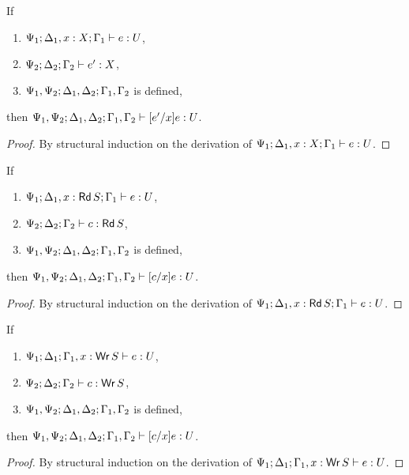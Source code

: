 \begin{lemma}\label{lem:sub-aff}
  If
  \begin{enumerate}
  \item $\Psi_1; \Delta_1, x : X; \Gamma_1 |- e : U$,
  \item $\Psi_2; \Delta_2; \Gamma_2 |- e' : X$,
  \item $\Psi_1,\Psi_2 ; \Delta_1,\Delta_2 ; \Gamma_1,\Gamma_2$ is defined,
  \end{enumerate}
  then $\Psi_1,\Psi_2; \Delta_1,\Delta_2; \Gamma_1,\Gamma_2 |- [e'/x]e : U$.
  \begin{proof}
    By structural induction on the derivation of $\Psi_1; \Delta_1, x : X; \Gamma_1 |- e : U$.
  \end{proof}
\end{lemma}

\begin{lemma}\label{lem:sub-rd}
  If
  \begin{enumerate}
  \item $\Psi_1; \Delta_1, x : \textnormal{\textsf{Rd}}\,S; \Gamma_1 |- e : U$,
  \item $\Psi_2; \Delta_2; \Gamma_2 |- c : \textnormal{\textsf{Rd}}\,S$,
  \item $\Psi_1,\Psi_2 ; \Delta_1,\Delta_2 ; \Gamma_1,\Gamma_2$ is defined,
  \end{enumerate}
  then $\Psi_1,\Psi_2; \Delta_1,\Delta_2; \Gamma_1,\Gamma_2 |- [c/x]e : U$.
  \begin{proof}
    By structural induction on the derivation of $\Psi_1; \Delta_1, x : \textnormal{\textsf{Rd}}\,S; \Gamma_1 |- e : U$.
  \end{proof}
\end{lemma}

\begin{lemma}\label{lem:sub-wr}
  If
  \begin{enumerate}
  \item $\Psi_1; \Delta_1; \Gamma_1, x : \textnormal{\textsf{Wr}}\,S |- e : U$,
  \item $\Psi_2; \Delta_2; \Gamma_2 |- c : \textnormal{\textsf{Wr}}\,S$,
  \item $\Psi_1,\Psi_2 ; \Delta_1,\Delta_2 ; \Gamma_1,\Gamma_2$ is defined,
  \end{enumerate}
  then $\Psi_1,\Psi_2; \Delta_1,\Delta_2; \Gamma_1,\Gamma_2 |- [c/x]e : U$.
  \begin{proof}
    By structural induction on the derivation of $\Psi_1; \Delta_1; \Gamma_1, x : \textnormal{\textsf{Wr}}\,S |- e : U$.
  \end{proof}
\end{lemma}

